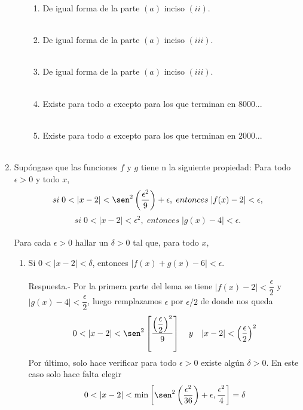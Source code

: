 \begin{enumerate}
\begin{enumerate}[\bfseries (a)]
\begin{enumerate}[\bfseries (i)]
	\item De igual forma de la parte $(a)$ inciso $(ii)$.\\\\
	
	\item De igual forma de la parte $(a)$ inciso $(iii)$.\\\\
	
	\item De igual forma de la parte $(a)$ inciso $(iii)$.\\\\
	
	\item Existe para todo $a$ excepto para los que terminan en $8000...$\\\\
	
	\item Existe para todo $a$ excepto para los que terminan en $2000...$\\\\

    \end{enumerate}

\end{enumerate}

\item Supóngase que las funciones $f$ y $g$ tiene n la siguiente propiedad: Para todo $\epsilon>0$ y todo $x$, $$si \; 0<|x-2|<\sen^2\left(\dfrac{\epsilon^2}{9}\right) + \epsilon, \; entonces \; |f(x)-2|<\epsilon,$$ $$si \; 0<|x-2|<\epsilon^2, \; entonces \; |g(x)-4| < \epsilon.$$\\
Para cada $\epsilon>0$ hallar un $\delta>0$ tal que, para todo $x$,\\
\begin{enumerate}[\bfseries (i)]
    
    \item Si $0<|x-2|<\delta$, entonces $|f(x)+g(x)-6|<\epsilon$.\\\\
	Respuesta.-\; Por la primera parte del lema se tiene $|f(x)-2|<\dfrac{\epsilon}{2}$ y $|g(x)-4|<\dfrac{\epsilon}{2}$, luego remplazamos $\epsilon$ por $\epsilon/2$ de donde nos queda $$0<|x-2|<\sen^2 \left[\dfrac{\left(\dfrac{\epsilon}{2}\right)^2}{9}\right] \quad y \quad |x-2|<\left(\dfrac{\epsilon}{2}\right)^2$$
	Por último, solo hace verificar para todo $\epsilon>0$ existe  algún $\delta>0$. En este caso solo hace falta elegir $$0<|x-2|<\min\left[\sen^2 \left(\dfrac{\epsilon^2}{36}\right)+\epsilon,\dfrac{\epsilon^2}{4}\right] = \delta$$\\


\end{enumerate}
\end{enumerate}
